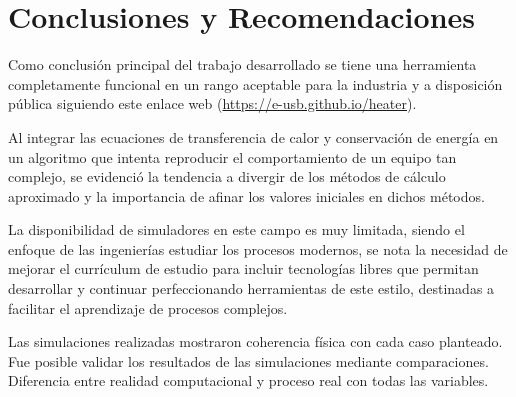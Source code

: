 \chapter*{Conclusiones y Recomendaciones}

\par Como conclusión principal del trabajo desarrollado se tiene una herramienta completamente funcional en un rango aceptable para la industria y a disposición pública siguiendo este enlace web (\url{https://e-usb.github.io/heater}).

\par Al integrar las ecuaciones de transferencia de calor y conservación de energía en un algoritmo que intenta reproducir el comportamiento de un equipo tan complejo, se evidenció la tendencia a divergir de los métodos de cálculo aproximado y la importancia de afinar los valores iniciales en dichos métodos.

\par La disponibilidad de simuladores en este campo es muy limitada, siendo el enfoque de las ingenierías estudiar los procesos modernos, se nota la necesidad de mejorar el currículum de estudio para incluir tecnologías libres que permitan desarrollar y continuar perfeccionando herramientas de este estilo, destinadas a facilitar el aprendizaje de procesos complejos.

\par 
Las simulaciones realizadas mostraron coherencia física con cada caso planteado.
Fue posible validar los resultados de las simulaciones mediante comparaciones.
Diferencia entre realidad computacional y proceso real con todas las variables.